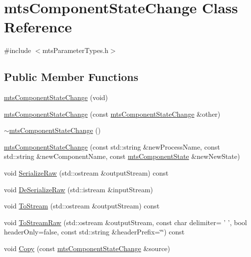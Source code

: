 \hypertarget{classmts_component_state_change}{\section{mts\-Component\-State\-Change Class Reference}
\label{classmts_component_state_change}
}


{\ttfamily \#include $<$mts\-Parameter\-Types.\-h$>$}

\subsection*{Public Member Functions}
\begin{DoxyCompactItemize}
\item 
\hyperlink{classmts_component_state_change_a5dc37ee3dc8836e824627f7229bdd236}{mts\-Component\-State\-Change} (void)
\item 
\hyperlink{classmts_component_state_change_a43aa2c2066a952bebe4eb093cf1d240f}{mts\-Component\-State\-Change} (const \hyperlink{classmts_component_state_change}{mts\-Component\-State\-Change} \&other)
\item 
\hyperlink{classmts_component_state_change_aaf67fd9dbb449fd51f1ec649479c088d}{$\sim$mts\-Component\-State\-Change} ()
\item 
\hyperlink{classmts_component_state_change_a343ac8a91e4299e056350735d5a6c140}{mts\-Component\-State\-Change} (const std\-::string \&new\-Process\-Name, const std\-::string \&new\-Component\-Name, const \hyperlink{classmts_component_state}{mts\-Component\-State} \&new\-New\-State)
\item 
void \hyperlink{classmts_component_state_change_a0b088d4104fa400c5e2a1025de2e2b2c}{Serialize\-Raw} (std\-::ostream \&output\-Stream) const 
\item 
void \hyperlink{classmts_component_state_change_a3afde6ad034e79da64dcf29742f074ef}{De\-Serialize\-Raw} (std\-::istream \&input\-Stream)
\item 
void \hyperlink{classmts_component_state_change_af6b19ba3c31199051c46eb1f18fb29e8}{To\-Stream} (std\-::ostream \&output\-Stream) const 
\item 
void \hyperlink{classmts_component_state_change_ae64dad5e63a8b2e9013ff0fc086712d5}{To\-Stream\-Raw} (std\-::ostream \&output\-Stream, const char delimiter= ' ', bool header\-Only=false, const std\-::string \&header\-Prefix=\char`\"{}\char`\"{}) const 
\item 
void \hyperlink{classmts_component_state_change_a3f4f3ab445dc09120b3021d1ae8fc895}{Copy} (const \hyperlink{classmts_component_state_change}{mts\-Component\-State\-Change} \&source)

\end{DoxyCompactItemize}
